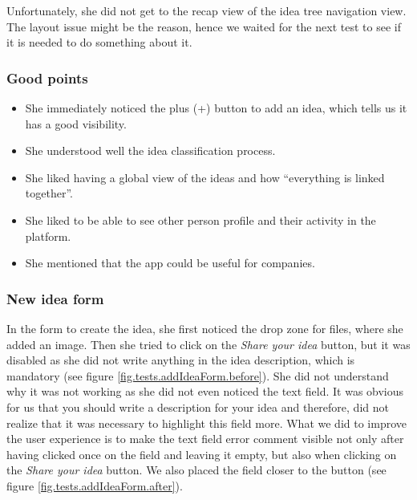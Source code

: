 \documentclass[a4paper,12pt, oneside]{article}
\begin{document}
Unfortunately, she did not get to the recap view of the idea tree navigation view.
The layout issue might be the reason, hence we waited for the next test to see if it is needed to do something about it.

\subsubsection*{Good points}
\begin{itemize}
    \item She immediately noticed the plus (+) button to add an idea, which tells us it has a good visibility.
    \item She understood well the idea classification process.
    \item She liked having a global view of the ideas and how “everything is linked together”.
    \item She liked to be able to see other person profile and their activity in the platform.
    \item She mentioned that the app could be useful for companies.
\end{itemize}

\subsubsection*{New idea form}
In the form to create the idea, she first noticed the drop zone for files, where she added an image.
Then she tried to click on the \emph{Share your idea} button, but it was disabled as she did not write anything in the idea description, which is mandatory (see figure \ref{fig.tests.addIdeaForm.before}).
She did not understand why it was not working as she did not even noticed the text field.
It was obvious for us that you should write a description for your idea and therefore, did not realize that it was necessary to highlight this field more.
What we did to improve the user experience is to make the text field error comment visible not only after having clicked once on the field and leaving it empty, but also when clicking on the \emph{Share your idea} button.
We also placed the field closer to the button (see figure \ref{fig.tests.addIdeaForm.after}).
\end{document}
